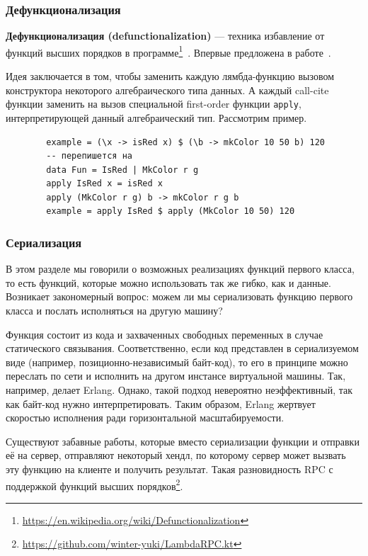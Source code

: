 \documentclass[12pt]{article}
\newcommand{\vocab}[1]{\textbf{#1}} %
\begin{document}
    \subsubsection{Дефункционализация} \label{subsubsec:defunctionalization}

    \vocab{Дефункционализация (defunctionalization)} --- техника избавление от функций высших порядков в программе\footnote{\url{https://en.wikipedia.org/wiki/Defunctionalization}}~\cite{defunctionalization-slides}.
    Впервые предложена в работе~\cite{reynolds1972definitional, reynolds1998definitional}.

    Идея заключается в том, чтобы заменить каждую лямбда-функцию вызовом конструктора некоторого алгебраического типа данных.
    А каждый call-cite функции заменить на вызов специальной first-order функции \texttt{apply}, интерпретирующей данный алгебраический тип.
    Рассмотрим пример.

    \begin{verbatim}
        example = (\x -> isRed x) $ (\b -> mkColor 10 50 b) 120
        -- перепишется на
        data Fun = IsRed | MkColor r g
        apply IsRed x = isRed x
        apply (MkColor r g) b -> mkColor r g b
        example = apply IsRed $ apply (MkColor 10 50) 120
    \end{verbatim}

    \subsubsection{Сериализация}

    В этом разделе мы говорили о возможных реализациях функций первого класса, то есть функций, которые можно использовать так же гибко, как и данные.
    Возникает закономерный вопрос: можем ли мы сериализовать функцию первого класса и послать исполняться на другую машину?

    Функция состоит из кода и захваченных свободных переменных в случае статического связывания.
    Соответственно, если код представлен в сериализуемом виде (например, позиционно-независимый байт-код), то его в принципе можно переслать по сети и исполнить на другом инстансе виртуальной машины.
    Так, например, делает Erlang.
    Однако, такой подход невероятно неэффективный, так как байт-код нужно интерпретировать.
    Таким образом, Erlang жертвует скоростью исполнения ради горизонтальной масштабируемости.

    Существуют забавные работы, которые вместо сериализации функции и отправки её на сервер, отправляют некоторый хендл, по которому сервер может вызвать эту функцию на клиенте и получить результат.
    Такая разновидность RPC с поддержкой функций высших порядков\footnote{\url{https://github.com/winter-yuki/LambdaRPC.kt}}.
\end{document}
